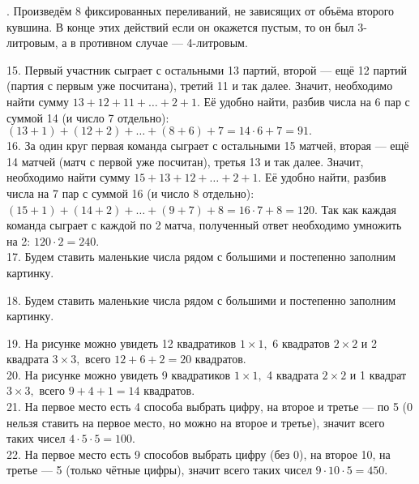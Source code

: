 \newpage
{}. Произведём 8 фиксированных переливаний, не зависящих от объёма второго кувшина. В конце этих действий если он окажется пустым, то он был 3-литровым, а в противном случае --- 4-литровым.
\begin{center}
\begin{figure}[h!]
\end{figure}
\end{center}
15. Первый участник сыграет с остальными 13 партий, второй --- ещё 12 партий (партия с первым уже посчитана), третий 11 и так далее. Значит, необходимо найти сумму $13+12+11+\ldots+2+1.$ Её удобно найти, разбив числа на 6 пар с суммой 14 (и число 7 отдельно): $(13+1)+(12+2)+\ldots+(8+6)+7=14\cdot6+7=91.$\\
16. За один круг первая команда сыграет с остальными 15 матчей, вторая --- ещё 14 матчей (матч с первой уже посчитан), третья 13 и так далее. Значит, необходимо найти сумму $15+13+12+\ldots+2+1.$ Её удобно найти, разбив числа на 7 пар с суммой 16 (и число 8 отдельно): $(15+1)+(14+2)+\ldots+(9+7)+8=16\cdot7+8=120.$ Так как каждая команда сыграет с каждой по 2 матча, полученный ответ необходимо умножить на 2: $120\cdot2=240.$\\
17. Будем ставить маленькие числа рядом с большими и постепенно заполним картинку.
\begin{center}
\begin{figure}[h!]
\end{figure}
\end{center}
18. Будем ставить маленькие числа рядом с большими и постепенно заполним картинку.
\begin{center}
\begin{figure}[h!]
\end{figure}
\end{center}
19. На рисунке можно увидеть 12 квадратиков $1\times1,$ 6 квадратов $2\times2$ и 2 квадрата $3\times3,$ всего $12+6+2=20$ квадратов.\\
20. На рисунке можно увидеть 9 квадратиков $1\times1,$ 4 квадрата $2\times2$ и 1 квадрат $3\times3,$ всего $9+4+1=14$ квадратов.\\
21. На первое место есть 4 способа выбрать цифру, на второе и третье --- по 5 (0 нельзя ставить на первое место, но можно на второе и третье), значит всего таких чисел $4\cdot5\cdot5=100.$\\
22. На первое место есть 9 способов выбрать цифру (без 0), на второе 10, на третье --- 5 (только чётные цифры), значит всего таких чисел $9\cdot10\cdot5=450.$\\
